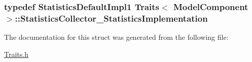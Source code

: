 \subsubsection[{\texorpdfstring{Statistics\+Collector\+\_\+\+Statistics\+Implementation}{StatisticsCollector_StatisticsImplementation}}]{\setlength{\rightskip}{0pt plus 5cm}typedef {\bf Statistics\+Default\+Impl1} {\bf Traits}$<$ {\bf Model\+Component} $>$\+::{\bf Statistics\+Collector\+\_\+\+Statistics\+Implementation}}\hypertarget{struct_traits_3_01_model_component_01_4_acf20ecaf5ac469daac2834bebcd95c17}{}\label{struct_traits_3_01_model_component_01_4_acf20ecaf5ac469daac2834bebcd95c17}


The documentation for this struct was generated from the following file\+:\begin{DoxyCompactItemize}
\item 
\hyperlink{_traits_8h}{Traits.\+h}\end{DoxyCompactItemize}
